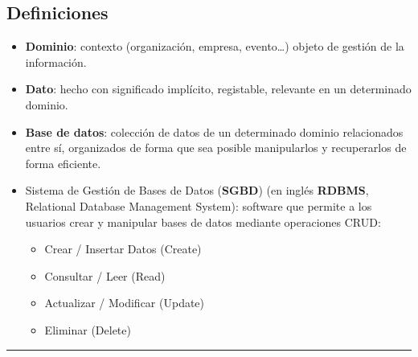 \documentclass[
]{book}
\providecommand{\tightlist}{%
  \setlength{\itemsep}{0pt}\setlength{\parskip}{0pt}}
\begin{document}
\hypertarget{definiciones}{%
\subsection{Definiciones}\label{definiciones}}

\begin{itemize}
\item
  \textbf{Dominio}: contexto (organización, empresa, evento\ldots) objeto de gestión de la información.
\item
  \textbf{Dato}: hecho con significado implícito, registable, relevante en un determinado dominio.
\item
  \textbf{Base de datos}: colección de datos de un determinado dominio relacionados entre sí, organizados de forma que sea posible manipularlos y recuperarlos de forma eficiente.
\item
  Sistema de Gestión de Bases de Datos (\textbf{SGBD}) (en inglés \textbf{RDBMS}, Relational Database Management System): software que permite a los usuarios crear y manipular bases de datos mediante operaciones CRUD:

  \begin{itemize}
  \tightlist
  \item
    Crear / Insertar Datos (Create)
  \item
    Consultar / Leer (Read)
  \item
    Actualizar / Modificar (Update)
  \item
    Eliminar (Delete)
  \end{itemize}
\end{itemize}

\begin{center}\rule{0.5\linewidth}{0.5pt}\end{center}
\end{document}

